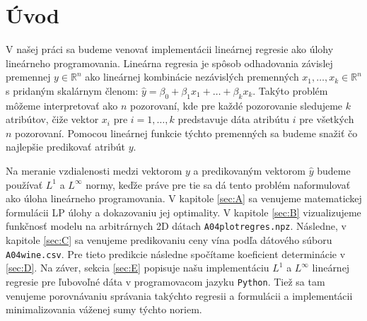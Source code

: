 \documentclass[report.tex]{subfiles}
\begin{document}
	
	\section{Úvod}	
	
	V našej práci sa budeme venovať implementácii lineárnej regresie ako úlohy lineárneho programovania. Lineárna regresia je spôsob odhadovania závislej premennej $y \in \mathbb{R}^n$ ako lineárnej kombinácie nezávislých premenných $x_1,\dots,x_k \in \mathbb{R}^n$ s pridaným skalárnym členom: $\hat{y} = \beta_0 + \beta_1x_1 + \dots + \beta_kx_k$. Takýto problém môžeme interpretovať ako $n$ pozorovaní, kde pre každé pozorovanie sledujeme $k$ atribútov, čiže vektor $x_i$ pre $i = 1,\dots ,k$ predstavuje dáta atribútu $i$ pre všetkých $n$ pozorovaní. Pomocou lineárnej funkcie týchto premenných sa budeme snažiť čo najlepšie predikovať atribút $y$.
	
	Na meranie vzdialenosti medzi vektorom $y$ a predikovaným vektorom $\hat{y}$ budeme používať $L^1$ a $L^{\infty}$ normy, keďže práve pre tie sa dá tento problém naformulovať ako úloha lineárneho programovania. V kapitole \ref{sec:A} sa venujeme matematickej formulácii LP úlohy a dokazovaniu jej optimality. V kapitole \ref{sec:B} vizualizujeme funkčnosť modelu na arbitrárnych 2D dátach \verb|A04plotregres.npz|. Následne, v kapitole \ref{sec:C} sa venujeme predikovaniu ceny vína podľa dátového súboru \verb|A04wine.csv|. Pre tieto predikcie následne spočítame koeficient determinácie v \ref{sec:D}. Na záver, sekcia \ref{sec:E} popisuje našu implementáciu $L^1$ a $L^{\infty}$ lineárnej regresie pre ľubovoľné dáta v programovacom jazyku \verb|Python|. Tiež sa tam venujeme porovnávaniu správania takýchto regresii a formulácii a implementácii minimalizovania váženej sumy týchto noriem.
	
\end{document}

